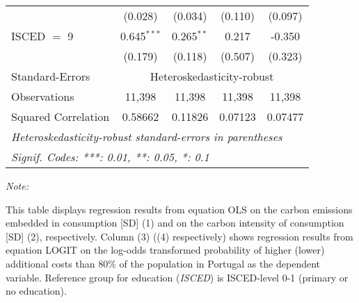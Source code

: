 \begin{table}[htbp!]
\begin{adjustbox}{width = 1\textwidth, max height = 0.95\textheight, center}
\begin{threeparttable}[b]
\begin{tabular}{lcccc}
                                 & (0.028)            & (0.034)            & (0.110)        & (0.097)\\   
            ISCED $=$ 9          & 0.645$^{***}$      & 0.265$^{**}$       & 0.217          & -0.350\\   
                                 & (0.179)            & (0.118)            & (0.507)        & (0.323)\\   
            \midrule 
            Standard-Errors & \multicolumn{4}{c}{Heteroskedasticity-robust} \\ 
            Observations         & 11,398             & 11,398             & 11,398         & 11,398\\  
            Squared Correlation  & 0.58662            & 0.11826            & 0.07123        & 0.07477\\  
            \midrule \midrule
            \multicolumn{5}{l}{\emph{Heteroskedasticity-robust standard-errors in parentheses}}\\
            \multicolumn{5}{l}{\emph{Signif. Codes: ***: 0.01, **: 0.05, *: 0.1}}\\
         \end{tabular}
         
         \begin{tablenotes}\item \medskip \textit{Note:}
            \item This table displays regression results from equation OLS on the carbon emissions embedded in consumption [SD] (1) and on the carbon intensity of consumption [SD] (2), respectively. 
                                      Column (3) ((4) respectively) shows regression results from equation LOGIT on the log-odds transformed probability of higher (lower) additional costs than 80\% of the population in Portugal as the dependent variable. Reference group for education (\textit{ISCED}) is ISCED-level 0-1 (primary or no education).
         \end{tablenotes}
      \end{threeparttable}
   \end{adjustbox}
\end{table}


